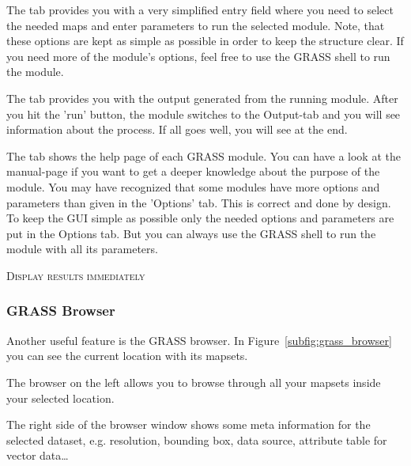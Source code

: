 
The  tab provides you with a very simplified entry field where you need to 
select the needed maps and enter parameters to run the selected module.
Note, that these options are kept as simple as possible in order to keep
the structure clear. If you need more of the module's options, feel free to 
use the GRASS shell to run the module.


The  tab provides you with the output generated from the running module. After you hit the 
'run' button, the module switches to the Output-tab and you will see information about 
the process. If all goes well, you will see  at the end.


The  tab shows the help page of each GRASS module. You can have a look at the manual-page
if you want to get a deeper knowledge about the purpose of the module.
You may have recognized that some modules have more options and parameters than given in
the 'Options' tab. This is correct and done by design. To keep the GUI simple as possible
only the needed options and parameters are put in the Options tab. But you can always 
use the GRASS shell to run the module with all its parameters.

\begin{Tip}\caption{\textsc{Display results immediately}}
\end{Tip} 


\subsubsection{GRASS Browser} 

Another useful feature is the GRASS browser. In Figure~\ref{subfig:grass_browser}
you can see the current location with its mapsets. 

The browser on the left allows you to browse through all your mapsets inside your selected
location. 

The right side of the browser window shows some meta information for the selected dataset, e.g. resolution,
bounding box, data source, attribute table for vector data\dots

